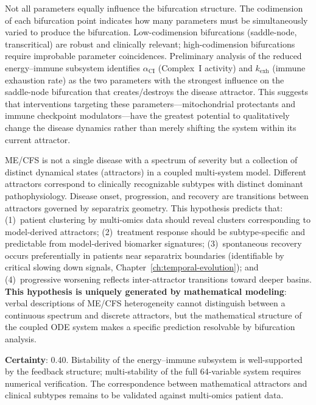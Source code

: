 Not all parameters equally influence the bifurcation structure. The codimension of each bifurcation point indicates how many parameters must be simultaneously varied to produce the bifurcation. Low-codimension bifurcations (saddle-node, transcritical) are robust and clinically relevant; high-codimension bifurcations require improbable parameter coincidences. Preliminary analysis of the reduced energy--immune subsystem identifies $\alpha_{\text{CI}}$ (Complex~I activity) and $k_{\text{exh}}$ (immune exhaustion rate) as the two parameters with the strongest influence on the saddle-node bifurcation that creates/destroys the disease attractor. This suggests that interventions targeting these parameters---mitochondrial protectants and immune checkpoint modulators---have the greatest potential to qualitatively change the disease dynamics rather than merely shifting the system within its current attractor.

\begin{hypothesis}
ME/CFS is not a single disease with a spectrum of severity but a collection of distinct dynamical states (attractors) in a coupled multi-system model. Different attractors correspond to clinically recognizable subtypes with distinct dominant pathophysiology. Disease onset, progression, and recovery are transitions between attractors governed by separatrix geometry. This hypothesis predicts that: (1)~patient clustering by multi-omics data should reveal clusters corresponding to model-derived attractors; (2)~treatment response should be subtype-specific and predictable from model-derived biomarker signatures; (3)~spontaneous recovery occurs preferentially in patients near separatrix boundaries (identifiable by critical slowing down signals, Chapter~\ref{ch:temporal-evolution}); and (4)~progressive worsening reflects inter-attractor transitions toward deeper basins. \textbf{This hypothesis is uniquely generated by mathematical modeling}: verbal descriptions of ME/CFS heterogeneity cannot distinguish between a continuous spectrum and discrete attractors, but the mathematical structure of the coupled ODE system makes a specific prediction resolvable by bifurcation analysis.

\textbf{Certainty}: 0.40. Bistability of the energy--immune subsystem is well-supported by the feedback structure; multi-stability of the full 64-variable system requires numerical verification. The correspondence between mathematical attractors and clinical subtypes remains to be validated against multi-omics patient data.
\end{hypothesis}


